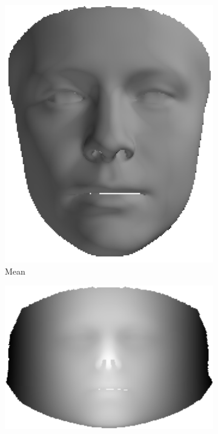 \begin{figure}
    \centering
    \hspace*{\fill}
    \begin{subfigure}[b]{0.125\textheight}
        \centering
        \includegraphics[width=\textwidth]{face_flow/images/contour_snapping/original_3d_model_mean}
        \caption{Mean}\label{subfig:face_flow_original_3d_mean}
    \end{subfigure} \hfill
    \begin{subfigure}[b]{0.23\textheight}
        \centering
        \includegraphics[width=\textwidth]{face_flow/images/contour_snapping/cylindrically_unwrapped}

\end{subfigure}
\end{figure}
